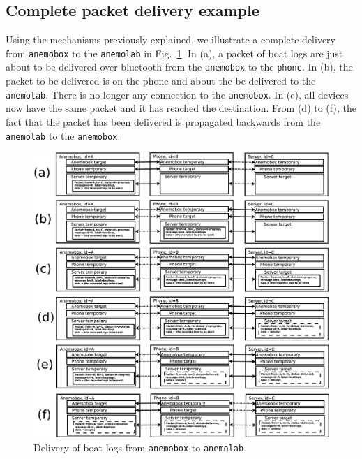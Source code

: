 \documentclass{article}
\newcommand{\device}[1]{\texttt{#1}}
\newcommand{\anemobox}{\device{anemobox}}
\newcommand{\phone}{\device{phone}}
\newcommand{\anemolab}{\texttt{anemolab}}
\begin{document}
\subsection{Complete packet delivery example}
\label{sec:delivery}
Using the mechanisms previously explained, we illustrate a complete delivery from \anemobox{} to the \anemolab{} in Fig.~\ref{fig:delivery}. In (a), a packet of boat logs are just about to be delivered over bluetooth from the \anemobox{} to the \phone{}. In (b), the packet to be delivered is on the phone and about the be delivered to the \anemolab{}. There is no longer any connection to the \anemobox{}. In (c), all devices now have the same packet and it has reached the destination. From (d) to (f), the fact that the packet has been delivered is propagated backwards from the \anemolab{} to the \anemobox{}.
\begin{figure}
  \includegraphics[width=\textwidth]{syncexample.eps}
  \caption{Delivery of boat logs from \anemobox{} to \anemolab{}.}
  \label{fig:delivery}
\end{figure}
\end{document}
